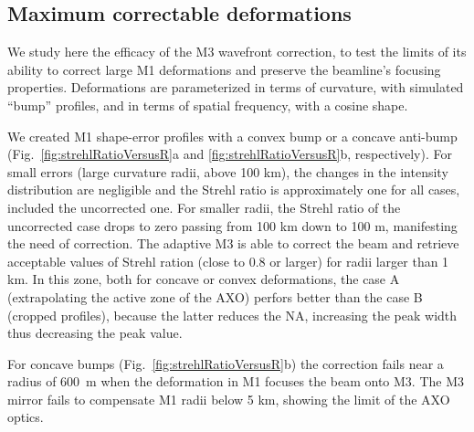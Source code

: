 \documentclass{iucr}
\begin{document}
\subsection{Maximum correctable deformations}
\label{sec:scans}

We study here the efficacy of the M3 wavefront correction, to test the limits of its ability to correct large M1 deformations and preserve the beamline's focusing properties. Deformations are parameterized in terms of curvature, with simulated ``bump'' profiles, and in terms of spatial frequency, with a cosine shape.

We created M1 shape-error profiles with a convex bump or a concave anti-bump (Fig.~\ref{fig:strehlRatioVersusR}a and \ref{fig:strehlRatioVersusR}b, respectively). For small errors (large curvature radii, above 100 km), the changes in the intensity distribution are negligible and the Strehl ratio is approximately one for all cases, included the uncorrected one. For smaller radii, the Strehl ratio of the uncorrected case drops to zero passing from 100 km down to 100 m, manifesting the need of correction. The adaptive M3 is able to correct the beam and retrieve acceptable values of Strehl ration (close to 0.8 or larger) for radii larger than 1 km. In this zone, both for concave or convex deformations, the case A (extrapolating the active zone of the AXO) perfors better than the case B (cropped profiles), because the latter reduces the NA, increasing the peak width thus decreasing the peak value. 

For concave bumps (Fig.~\ref{fig:strehlRatioVersusR}b) the correction fails near a radius of 600~m when the deformation in M1 focuses the beam onto M3. The M3 mirror fails to compensate M1 radii below 5 km, showing the limit of the AXO optics.

 
 
\end{document}
